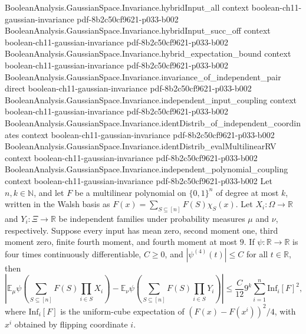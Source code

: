 \begin{theorem}
\proofstep
  {BooleanAnalysis.GaussianSpace.Invariance.hybridInput_all}
  {context}
  {boolean-ch11-gaussian-invariance}
  {pdf-8b2c50cf9621-p033-b002}
\proofstep
  {BooleanAnalysis.GaussianSpace.Invariance.hybridInput_succ_off}
  {context}
  {boolean-ch11-gaussian-invariance}
  {pdf-8b2c50cf9621-p033-b002}
\proofstep
  {BooleanAnalysis.GaussianSpace.Invariance.hybrid_expectation_bound}
  {context}
  {boolean-ch11-gaussian-invariance}
  {pdf-8b2c50cf9621-p033-b002}
\proofstep
  {BooleanAnalysis.GaussianSpace.Invariance.invariance_of_independent_pair}
  {direct}
  {boolean-ch11-gaussian-invariance}
  {pdf-8b2c50cf9621-p033-b002}
\proofstep
  {BooleanAnalysis.GaussianSpace.Invariance.independent_input_coupling}
  {context}
  {boolean-ch11-gaussian-invariance}
  {pdf-8b2c50cf9621-p033-b002}
\proofstep
  {BooleanAnalysis.GaussianSpace.Invariance.identDistrib_of_independent_coordinates}
  {context}
  {boolean-ch11-gaussian-invariance}
  {pdf-8b2c50cf9621-p033-b002}
\proofstep
  {BooleanAnalysis.GaussianSpace.Invariance.identDistrib_evalMultilinearRV}
  {context}
  {boolean-ch11-gaussian-invariance}
  {pdf-8b2c50cf9621-p033-b002}
\proofstep
  {BooleanAnalysis.GaussianSpace.Invariance.independent_polynomial_coupling}
  {context}
  {boolean-ch11-gaussian-invariance}
  {pdf-8b2c50cf9621-p033-b002}
Let $n,k\in\mathbb N$, and let $F$ be a multilinear polynomial on $\{0,1\}^n$ of degree
at most $k$, written in the Walsh basis as $F(x)=\sum_{S\subseteq[n]}F(S)\chi_S(x)$. Let
$X_i\colon\Omega\to\mathbb R$ and $Y_i\colon\Xi\to\mathbb R$ be independent families
under probability measures $\mu$ and $\nu$, respectively. Suppose every input has mean
zero, second moment one, third moment zero, finite fourth moment, and fourth moment at
most $9$. If $\psi\colon\mathbb R\to\mathbb R$ is four times continuously
differentiable, $C\ge0$, and $|\psi^{(4)}(t)|\le C$ for all $t\in\mathbb R$, then
\[
\left|\mathbb E_\mu\psi\!\left(\sum_{S\subseteq[n]}F(S)\prod_{i\in S}X_i\right)-\mathbb
E_\nu\psi\!\left(\sum_{S\subseteq[n]}F(S)\prod_{i\in S}Y_i\right)\right|
\le \frac C{12}9^k\sum_{i=1}^n \mathrm{Inf}_i[F]^2,
\]
where $\mathrm{Inf}_i[F]$ is the uniform-cube expectation of $(F(x)-F(x^i))^2/4$, with
$x^i$ obtained by flipping coordinate $i$.
\end{theorem}


